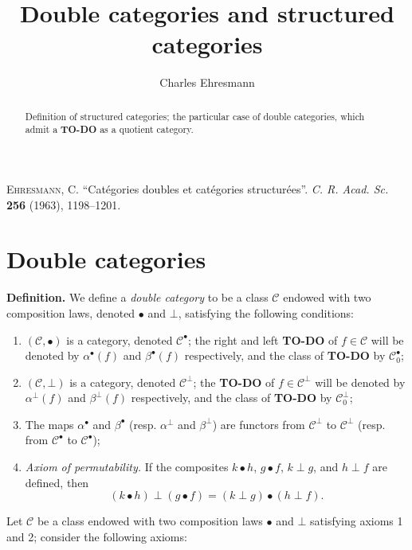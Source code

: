 \documentclass{article}
\title{Double categories and structured categories}
\author{Charles Ehresmann}
\date{}
\newcommand{\origcit}{%
  \textsc{Ehresmann, C.}
  ``Catégories doubles et catégories structurées''.
  \emph{C. R. Acad. Sc.} \textbf{256} (1963), 1198--1201.
}
\newenvironment{rmenv}[1]
  {\phantomsection\par\medskip\noindent\textbf{#1.}\rmfamily}
  {\par\medskip}
\newcommand{\oldpage}[1]{\marginpar{\footnotesize$\Big\vert$ \textit{p.~#1}}}
\newcommand{\todo}{{\color{purple}\textbf{TO-DO }}}
\newcommand{\cd}{{\mathbin{\bullet}}}
\newcommand{\cb}{{\mathbin{\bot}}}
\begin{document}
\maketitle
\origcit

\begin{abstract}
  Definition of structured categories; the particular case of double categories, which admit a \todo as a quotient category.
\end{abstract}


\section{Double categories}
\oldpage{1}

\begin{rmenv}{Definition}
  We define a \emph{double category} to be a class $\mathcal{C}$ endowed with two composition laws, denoted $\cd$ and $\cb$, satisfying the following conditions:
  
  \begin{enumerate}
    \item $(\mathcal{C},\cd)$ is a category, denoted $\mathcal{C}^\cd$;
      the right and left \todo of $f\in\mathcal{C}$ will be denoted by $\alpha^\cd(f)$ and $\beta^\cd(f)$ respectively, and the class of \todo by $\mathcal{C}_0^\cd$;
    \item $(\mathcal{C},\cb)$ is a category, denoted $\mathcal{C}^\cb$;
      the \todo of $f\in\mathcal{C}^\cb$ will be denoted by $\alpha^\cb(f)$ and $\beta^\cb(f)$ respectively, and the class of \todo by $\mathcal{C}_0^\cb$;
    \item The maps $\alpha^\cd$ and $\beta^\cd$ (resp. $\alpha^\cb$ and $\beta^\cb$) are functors from $\mathcal{C}^\cb$ to $\mathcal{C}^\cb$ (resp. from $\mathcal{C}^\cd$ to $\mathcal{C}^\cd$);
    \item \emph{Axiom of permutability.}
      If the composites $k\cd h$, $g\cd f$, $k\cb g$, and $h\cb f$ are defined, then
      \[
        (k\cd h)\cb(g\cd f)
        = (k\cb g)\cd(h\cb f).
      \]
  \end{enumerate}

  Let $\mathcal{C}$ be a class endowed with two composition laws $\cd$ and $\cb$ satisfying axioms 1 and 2; consider the following axioms:


\end{rmenv}
\end{document}
